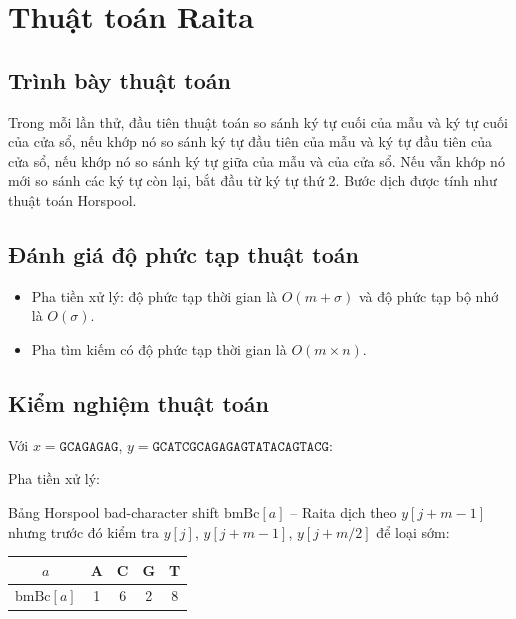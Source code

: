 \documentclass[12pt,twoside,openright]{extreport}
\begin{document}
\section{Thuật toán Raita}

\subsection{Trình bày thuật toán}

Trong mỗi lần thử, đầu tiên thuật toán so sánh ký tự cuối của mẫu và ký tự cuối của cửa sổ, nếu khớp nó so sánh ký tự đầu tiên của mẫu và ký tự đầu tiên của cửa sổ, nếu khớp nó so sánh ký tự giữa của mẫu và của cửa sổ. Nếu vẫn khớp nó mới so sánh các ký tự còn lại, bắt đầu từ ký tự thứ 2. Bước dịch được tính như thuật toán Horspool.

\subsection{Đánh giá độ phức tạp thuật toán}

\begin{itemize}
	\item Pha tiền xử lý: độ phức tạp thời gian là $O(m + \sigma)$ và độ phức tạp bộ nhớ là $O(\sigma)$.
	\item Pha tìm kiếm có độ phức tạp thời gian là $O(m \times n)$.
\end{itemize}

\subsection{Kiểm nghiệm thuật toán}

Với $x = \texttt{GCAGAGAG}$, $y = \texttt{GCATCGCAGAGAGTATACAGTACG}$:

Pha tiền xử lý:

Bảng Horspool bad-character shift $\text{bmBc}[a]$ -- Raita dịch theo $y[j+m-1]$ nhưng trước đó kiểm tra $y[j]$, $y[j+m-1]$, $y[j+m/2]$ để loại sớm:

\begin{center}
\begin{tabular}{|c|c|c|c|c|}
\hline
$a$ & A & C & G & T \\
\hline
$\text{bmBc}[a]$ & 1 & 6 & 2 & 8 \\
\hline
\end{tabular}
\end{center}
\end{document}
